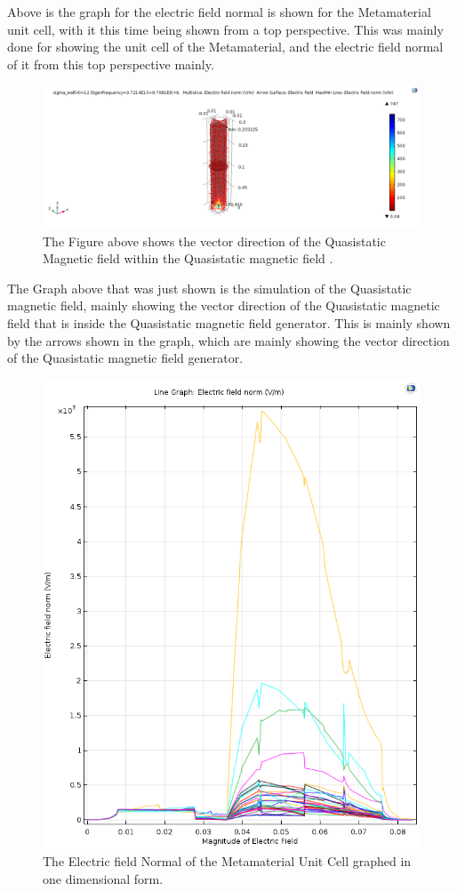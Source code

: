 \documentclass[]{article}
\begin{document}
\noindent
Above is the graph for the electric field normal is shown for the Metamaterial unit cell, with it this time being shown from a top perspective. This was mainly done for showing the unit cell of the Metamaterial, and the electric field normal of it from this top perspective mainly. 
\begin{figure}[H]
	\centering
	\includegraphics[width=\textwidth]{QuasistaticMagneticFieldVectorDirectionGraphImages.png}
	\caption{The Figure above shows the vector direction of the Quasistatic Magnetic field within the Quasistatic magnetic field .}
	\label{test982}
\end{figure}
\noindent
The Graph above that was just shown is the simulation of the Quasistatic magnetic field, mainly showing the vector direction of the Quasistatic magnetic field that is inside the Quasistatic magnetic field generator. This is mainly shown by the arrows shown in the graph, which are mainly showing the vector direction of the Quasistatic magnetic field generator. 
\begin{figure}[H]
	\centering
	\includegraphics[width=10.5 cm, height=10.5 cm]{OneDElectricFieldNormalGraphImage.png}
	\caption{The Electric field Normal of the Metamaterial Unit Cell graphed in one dimensional form.}
	\label{test8128382}
\end{figure}
\end{document}
